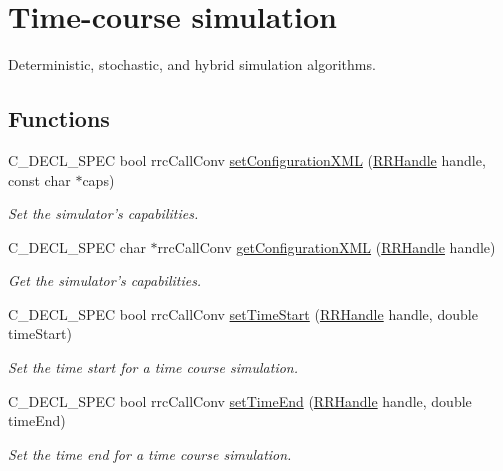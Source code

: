 \hypertarget{group__simulation}{\section{Time-\/course simulation}
\label{group__simulation}
}


Deterministic, stochastic, and hybrid simulation algorithms.  


\subsection*{Functions}
\begin{DoxyCompactItemize}
\item 
C\-\_\-\-D\-E\-C\-L\-\_\-\-S\-P\-E\-C bool rrc\-Call\-Conv \hyperlink{group__simulation_ga704215830b7d1b353cbd990c04a766c2}{set\-Configuration\-X\-M\-L} (\hyperlink{rrc__types_8h_a1d68f0592372208fa5a5f2799ea4b3ae}{R\-R\-Handle} handle, const char $\ast$caps)
\begin{DoxyCompactList}\small\item\em Set the simulator's capabilities. \end{DoxyCompactList}\item 
C\-\_\-\-D\-E\-C\-L\-\_\-\-S\-P\-E\-C char $\ast$rrc\-Call\-Conv \hyperlink{group__simulation_ga8529fc3333deee1eb8f966b70bcf4cac}{get\-Configuration\-X\-M\-L} (\hyperlink{rrc__types_8h_a1d68f0592372208fa5a5f2799ea4b3ae}{R\-R\-Handle} handle)
\begin{DoxyCompactList}\small\item\em Get the simulator's capabilities. \end{DoxyCompactList}\item 
C\-\_\-\-D\-E\-C\-L\-\_\-\-S\-P\-E\-C bool rrc\-Call\-Conv \hyperlink{group__simulation_ga6f2c769375399d14087d6e5e99339aa7}{set\-Time\-Start} (\hyperlink{rrc__types_8h_a1d68f0592372208fa5a5f2799ea4b3ae}{R\-R\-Handle} handle, double time\-Start)
\begin{DoxyCompactList}\small\item\em Set the time start for a time course simulation. \end{DoxyCompactList}\item 
C\-\_\-\-D\-E\-C\-L\-\_\-\-S\-P\-E\-C bool rrc\-Call\-Conv \hyperlink{group__simulation_ga93f6c401b6a9e301fcdc380a6048b28c}{set\-Time\-End} (\hyperlink{rrc__types_8h_a1d68f0592372208fa5a5f2799ea4b3ae}{R\-R\-Handle} handle, double time\-End)
\begin{DoxyCompactList}\small\item\em Set the time end for a time course simulation. \end{DoxyCompactList}\item 

\end{DoxyCompactItemize}

